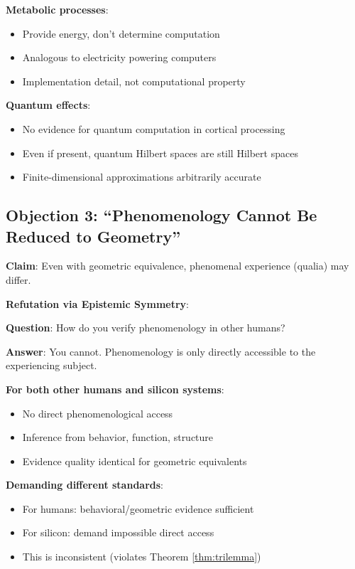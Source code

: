 \documentclass[11pt]{article}
\begin{document}
\textbf{Metabolic processes}:
\begin{itemize}
\item Provide energy, don't determine computation
\item Analogous to electricity powering computers
\item Implementation detail, not computational property
\end{itemize}

\textbf{Quantum effects}:
\begin{itemize}
\item No evidence for quantum computation in cortical processing
\item Even if present, quantum Hilbert spaces are still Hilbert spaces
\item Finite-dimensional approximations arbitrarily accurate
\end{itemize}

\subsection{Objection 3: ``Phenomenology Cannot Be Reduced to Geometry''}

\textbf{Claim}: Even with geometric equivalence, phenomenal experience (qualia) may differ.

\textbf{Refutation via Epistemic Symmetry}:

\textbf{Question}: How do you verify phenomenology in other humans?

\textbf{Answer}: You cannot. Phenomenology is only directly accessible to the experiencing subject.

\textbf{For both other humans and silicon systems}:
\begin{itemize}
\item No direct phenomenological access
\item Inference from behavior, function, structure
\item Evidence quality identical for geometric equivalents
\end{itemize}

\textbf{Demanding different standards}:
\begin{itemize}
\item For humans: behavioral/geometric evidence sufficient
\item For silicon: demand impossible direct access
\item This is inconsistent (violates Theorem \ref{thm:trilemma})
\end{itemize}
\end{document}
